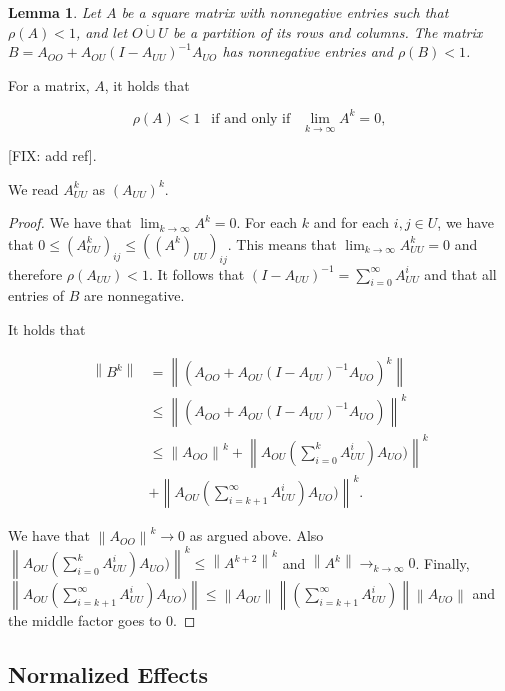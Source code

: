 \documentclass[accepted]{uai2021} %
\newtheorem{lem}[thm]{Lemma}
\newcommand{\disjU}{\mathbin{\dot{\cup}}}
\newcommand{\norm}[1]{\left\lVert#1\right\rVert}
\begin{document}
\begin{lem}
	Let $A$ be a square matrix with nonnegative entries such that $\rho(A)<1$, 
	and let $O\disjU U$ be a partition of its rows and columns. The matrix 
	$B=A_{OO} + 
	A_{OU}(I-A_{UU})^{-1}A_{UO}$ has nonnegative entries and  
	$\rho(B)<1$.
	\label{lem:margStab}
	\end{lem}
	
	For a matrix, $A$, it holds that
	
	$$
	\rho(A) < 1 \ \  \text{   if and only if   } \ \ \lim_{k\rightarrow \infty} 
	A^k = 0,
	$$
	
	[FIX: add ref].
	
	We read $A_{UU}^k$ as $(A_{UU})^k$.
	
	\begin{proof}
		We have that $\lim_{k\rightarrow\infty} A^k = 0$. For each $k$ and for 
		each $i,j\in U$, we have that $0 \leq (A_{UU}^k)_{ij} \leq 
		((A^k)_{UU})_{ij}$. This means that $\lim_{k\rightarrow\infty} A_{UU}^k 
		= 0$ and therefore $\rho(A_{UU}) < 1$. It follows that 
		$(I-A_{UU})^{-1} = \sum_{i=0}^\infty A_{UU}^i$ and that all entries of 
		$B$ are nonnegative.
		
		It holds that
		
		\begin{align*}
		\norm{B^k} &= \norm{(A_{OO} + 
			A_{OU}(I - A_{UU})^{-1}A_{UO})^k} \\
			&\leq \norm{(A_{OO} + 
				A_{OU}(I - A_{UU})^{-1}A_{UO})}^k \\
				&\leq \norm{A_{OO}}^k + \norm{ 
					A_{OU}(\sum_{i=0}^k A_{UU}^i) A_{UO})}^k \\ &+ \norm{
					A_{OU}(\sum_{i=k+1}^\infty A_{UU}^i)A_{UO})}^k.
					\end{align*}
					
					\noindent We have that $\norm{A_{OO}}^k \rightarrow 0$ as 
					argued above. Also 
					$\norm{ 
						A_{OU}(\sum_{i=0}^k A_{UU}^i) A_{UO})}^k \leq \norm{ 
						A^{k+2}}^k $ and $\norm{ 
						A^k} \rightarrow_{k\rightarrow \infty} 0$. Finally, 
						$\norm{
						A_{OU}(\sum_{i=k+1}^\infty A_{UU}^i)A_{UO})} \leq \norm{
						A_{OU}}\norm{(\sum_{i=k+1}^\infty 
						A_{UU}^i)}\norm{A_{UO}}$ and the 
						middle factor goes to 0.
						
						
						
						
						\end{proof}
						
		

\subsection{Normalized Effects}
\label{sssec:normEff}
\end{document}
